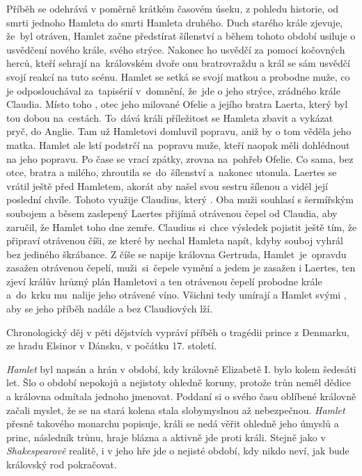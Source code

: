 \documentclass{extarticle} %
\begin{document}
\noindent 
Příběh se odehrává v poměrně krátkém časovém úseku, z pohledu historie,
od smrti jednoho Hamleta do smrti Hamleta druhého.
Duch starého krále zjevuje, že~byl otráven, Hamlet začne předstírat šílenství
a během tohoto období usiluje o usvědčení nového krále, svého strýce.
Nakonec ho usvědčí za pomoci kočovných herců, kteří sehrají na~královském dvoře onu bratrovraždu
a král se sám usvědčí svojí reakcí na tuto scénu.
Hamlet se setká se svojí matkou a probodne muže, co je odposlouchával za~tapisérií v~domnění,
že~jde o jeho strýce, zrádného krále Claudia.
Místo toho , otec jeho milované Ofelie a jejího bratra Laerta,
který byl tou dobou na~cestách.
To~dává králi příležitost se Hamleta zbavit a vykázat pryč, do Anglie.
Tam už Hamletovi domluvil popravu, aniž by o tom věděla jeho matka.
Hamlet ale lstí podstrčí na~popravu muže, kteří naopak měli dohlédnout na jeho popravu.
Po čase se vrací zpátky, zrovna na~pohřeb Ofelie.
Co sama, bez otce, bratra a milého, zhroutila se~do~šílenství a~nakonec utonula.
Laertes se vrátil ještě před Hamletem, akorát aby našel svou sestru šílenou a viděl její poslední chvíle.
Tohoto využije Claudius, který .
Oba muži souhlasí s šermířským soubojem a běsem zaslepený Laertes přijímá otrávenou čepel od Claudia,
aby zaručil, že Hamlet toho dne zemře.
Claudius si~chce výsledek pojistit ještě tím, že připraví otrávenou číši,
ze které by nechal Hamleta napít, kdyby souboj vyhrál bez jediného škrábance.
Z číše se napije královna Gertruda, Hamlet~je~opravdu zasažen otrávenou čepelí,
muži~si~čepele vymění a jedem je zasažen i Laertes, ten zjeví králův hrůzný plán Hamletovi
a ten otrávenou čepelí probodne krále a~do~krku mu~nalije jeho otrávené víno.
Všichni tedy umírají a Hamlet svými ,
aby se jeho příběh nadále  a bez Claudiových lží.

\noindent 
Chronologický děj v pěti dějstvích vypráví příběh o tragédii prince z Denmarku, ze hradu Elsinor v Dánsku, v počátku 17. století.



\noindent
\textit{Hamlet} byl napsán a hrán v období, kdy královně Elizabetě I. bylo kolem šedesáti let.
Šlo o období nepokojů a nejistoty ohledně koruny, protože trůn neměl dědice a královna odmítala jednoho jmenovat.
Poddaní si o svého času oblíbené královně začali myslet, že se na stará kolena stala slobymyslnou až nebezpečnou.
\textit{Hamlet} přesně takového monarchu popisuje, králi se nedá věřit ohledně jeho úmyslů a princ, následník trůnu, hraje blázna a aktivně jde proti králi.
Stejně jako v \textit{Shakespearově} realitě, i v jeho hře jde o nejisté období, kdy nikdo neví, jak bude královský rod pokračovat.
\end{document}
